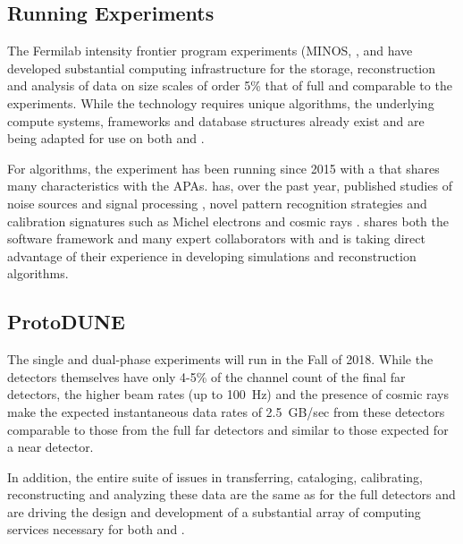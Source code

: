 \subsection{Running Experiments}\label{sw:IF-input}

The Fermilab intensity frontier program experiments (MINOS\cite{minosNIM},  \cite{minerva}, \cite{microboone} and  \cite{Adamson:2016xxw} have developed substantial computing infrastructure for the storage, reconstruction and analysis of data on size scales of order 5\% that of full   and comparable to the  experiments. While the \lartpc technology requires unique algorithms, the underlying compute systems, frameworks and database structures already exist and are being adapted for use on both  and  .

For algorithms, the  \cite{Acciarri:2016smi} experiment has been running since 2015 with a \lartpc that shares many characteristics with the   APAs.     has, over the past year, published studies of noise sources and signal processing \cite{Acciarri:2017sde,Adams:2018dra}, novel pattern recognition strategies \cite{Acciarri:2016ryt,Acciarri:2017hat} and calibration signatures such as Michel electrons and cosmic rays \cite{Acciarri:2017sjy,Acciarri:2017sde}.    shares both the \larsoft software framework and many expert collaborators with   and is taking direct advantage of their experience in developing simulations and reconstruction algorithms.


\subsection{ProtoDUNE}\label{sw:PD-planning}

The  single and dual-phase experiments will run in the Fall of 2018.  While the detectors themselves have only 4-5\% of the channel count  of the final far detectors, the higher beam rates (up to 100~Hz) and the presence of cosmic rays make the expected instantaneous data rates of 2.5~GB/sec from these detectors comparable to those from the full far detectors and similar to those expected for a near detector. 

In addition, the entire suite of issues in transferring, cataloging, calibrating, reconstructing and analyzing these data are the same as for the full detectors and are driving the design and development of a substantial array of computing services necessary for both  and  .

